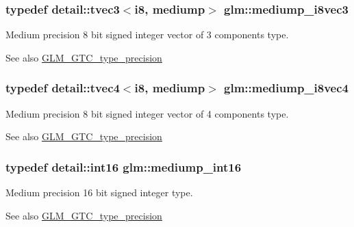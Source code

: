 \subsubsection[{\texorpdfstring{mediump\+\_\+i8vec3}{mediump_i8vec3}}]{\setlength{\rightskip}{0pt plus 5cm}typedef detail\+::tvec3$<$i8, mediump$>$ {\bf glm\+::mediump\+\_\+i8vec3}}\hypertarget{group__gtc__type__precision_ga91b40a693c1db26a7cc544339b326df3}{}\label{group__gtc__type__precision_ga91b40a693c1db26a7cc544339b326df3}
Medium precision 8 bit signed integer vector of 3 components type. \begin{DoxySeeAlso}{See also}
\hyperlink{group__gtc__type__precision}{G\+L\+M\+\_\+\+G\+T\+C\+\_\+type\+\_\+precision} 
\end{DoxySeeAlso}
\subsubsection[{\texorpdfstring{mediump\+\_\+i8vec4}{mediump_i8vec4}}]{\setlength{\rightskip}{0pt plus 5cm}typedef detail\+::tvec4$<$i8, mediump$>$ {\bf glm\+::mediump\+\_\+i8vec4}}\hypertarget{group__gtc__type__precision_gad41bf4bfa504dc1191623ff77151d01f}{}\label{group__gtc__type__precision_gad41bf4bfa504dc1191623ff77151d01f}
Medium precision 8 bit signed integer vector of 4 components type. \begin{DoxySeeAlso}{See also}
\hyperlink{group__gtc__type__precision}{G\+L\+M\+\_\+\+G\+T\+C\+\_\+type\+\_\+precision} 
\end{DoxySeeAlso}
\subsubsection[{\texorpdfstring{mediump\+\_\+int16}{mediump_int16}}]{\setlength{\rightskip}{0pt plus 5cm}typedef detail\+::int16 {\bf glm\+::mediump\+\_\+int16}}\hypertarget{group__gtc__type__precision_ga4611997edb6c61606daa11990cf08798}{}\label{group__gtc__type__precision_ga4611997edb6c61606daa11990cf08798}
Medium precision 16 bit signed integer type. \begin{DoxySeeAlso}{See also}
\hyperlink{group__gtc__type__precision}{G\+L\+M\+\_\+\+G\+T\+C\+\_\+type\+\_\+precision} 
\end{DoxySeeAlso}
